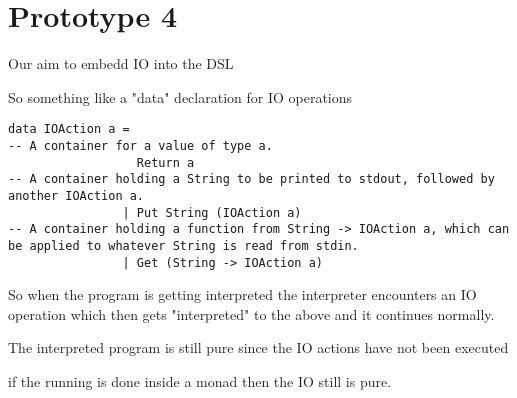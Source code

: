 \documentclass[proposal.tex]{subfiles}
\begin{document}
\section{Prototype 4}{\label{proto4}}


Our aim to embedd IO into the DSL

So something like a "data" declaration for IO operations

\begin{verbatim}
data IOAction a = 
-- A container for a value of type a.
                  Return a 
-- A container holding a String to be printed to stdout, followed by another IOAction a.
                | Put String (IOAction a) 
-- A container holding a function from String -> IOAction a, which can be applied to whatever String is read from stdin.
                | Get (String -> IOAction a)
\end{verbatim}

So when the program is getting interpreted the interpreter encounters an IO operation which then gets "interpreted" to the above and it 
continues normally.

The interpreted program is still pure since the IO actions have not been executed 

if the running is done inside a monad then the IO still is pure.
\end{document}
